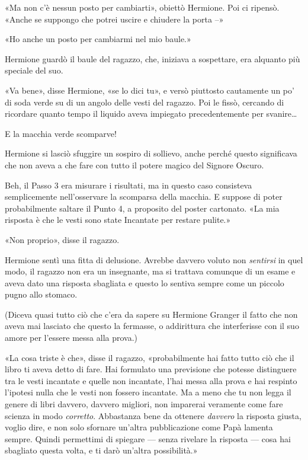 «Ma non c’è nessun posto per cambiarti», obiettò Hermione. Poi ci ripensò. «Anche se suppongo che potrei uscire e chiudere la porta –»

«Ho anche un posto per cambiarmi nel mio baule.»

Hermione guardò il baule del ragazzo, che, iniziava a sospettare, era alquanto più speciale del suo.

«Va bene», disse Hermione, «se lo dici tu», e versò piuttosto cautamente un po’ di soda verde su di un angolo delle vesti del ragazzo. Poi le fissò, cercando di ricordare quanto tempo il liquido aveva impiegato precedentemente per svanire…

E la macchia verde scomparve!

Hermione si lasciò sfuggire un sospiro di sollievo, anche perché questo significava che non aveva a che fare con tutto il potere magico del Signore Oscuro.

Beh, il Passo 3 era misurare i risultati, ma in questo caso consisteva semplicemente nell’osservare la scomparsa della macchia. E suppose di poter probabilmente saltare il Punto 4, a proposito del poster cartonato. «La mia risposta è che le vesti sono state Incantate per restare pulite.»

«Non proprio», disse il ragazzo.

Hermione sentì una fitta di delusione. Avrebbe davvero voluto non \textit{sentirsi} in quel modo, il ragazzo non era un insegnante, ma si trattava comunque di un esame e aveva dato una risposta sbagliata e questo lo sentiva sempre come un piccolo pugno allo stomaco.

(Diceva quasi tutto ciò che c’era da sapere su Hermione Granger il fatto che non aveva mai lasciato che questo la fermasse, o addirittura che interferisse con il suo amore per l’essere messa alla prova.)

«La cosa triste è che», disse il ragazzo, «probabilmente hai fatto tutto ciò che il libro ti aveva detto di fare. Hai formulato una previsione che potesse distinguere tra le vesti incantate e quelle non incantate, l’hai messa alla prova e hai respinto l’ipotesi nulla che le vesti non fossero incantate. Ma a meno che tu non legga il genere di libri davvero, davvero migliori, non imparerai veramente come fare scienza in modo \textit{corretto}. Abbastanza bene da ottenere \textit{davvero} la risposta giusta, voglio dire, e non solo sfornare un’altra pubblicazione come Papà lamenta sempre. Quindi permettimi di spiegare — senza rivelare la risposta — cosa hai sbagliato questa volta, e ti darò un’altra possibilità.»

